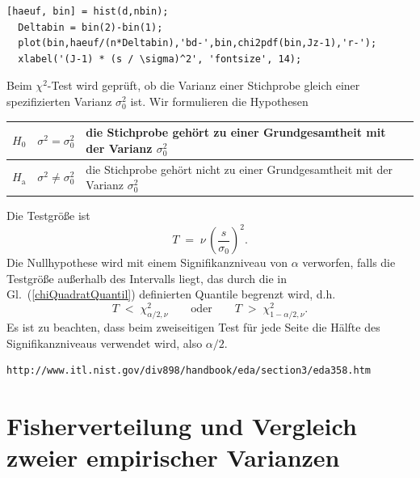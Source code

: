 \begin{lstlisting}[style=Matlab]
  [haeuf, bin] = hist(d,nbin);
  Deltabin = bin(2)-bin(1);
  plot(bin,haeuf/(n*Deltabin),'bd-',bin,chi2pdf(bin,Jz-1),'r-');
  xlabel('(J-1) * (s / \sigma)^2', 'fontsize', 14);
\end{lstlisting}

Beim $\chi^2$-Test wird geprüft, ob die Varianz einer Stichprobe gleich einer
spezifizierten Varianz $\sigma_0^2$ ist. Wir formulieren die Hypothesen
\begin{center}
\begin{tabular}{c|cl}
$H_0$ & $\sigma^2 = \sigma_0^2$ & die Stichprobe gehört zu einer Grundgesamtheit mit der Varianz $\sigma_0^2$\\
\hline
$H_\mathrm{a}$ & $\sigma^2 \neq \sigma_0^2$ & die Stichprobe gehört nicht zu einer Grundgesamtheit mit der Varianz $\sigma_0^2$
\end{tabular}
\end{center}
Die Testgröße ist
\begin{equation}
T \; = \; \nu \, \left( \frac{s}{\sigma_0} \right)^2 .
\label{chi2testgroesse}
\end{equation}
Die Nullhypothese wird mit einem Signifikanzniveau von $\alpha$
verworfen, falls die Testgröße außerhalb des Intervalls liegt,
das durch die in Gl.~(\ref{chiQuadratQuantil}) definierten Quantile begrenzt wird, d.h.
\begin{equation}
T \; < \; \chi^2_{\alpha/2, \nu}  \qquad \mathrm{oder} \qquad
T \; > \; \chi^2_{1-\alpha/2, \nu} .
\end{equation}
Es ist zu beachten, dass beim zweiseitigen Test für jede Seite die
Hälfte des Signifikanzniveaus verwendet wird, also $\alpha/2$.

\begin{verbatim}
http://www.itl.nist.gov/div898/handbook/eda/section3/eda358.htm
\end{verbatim}


\section{Fisherverteilung und Vergleich zweier empirischer Varianzen}

